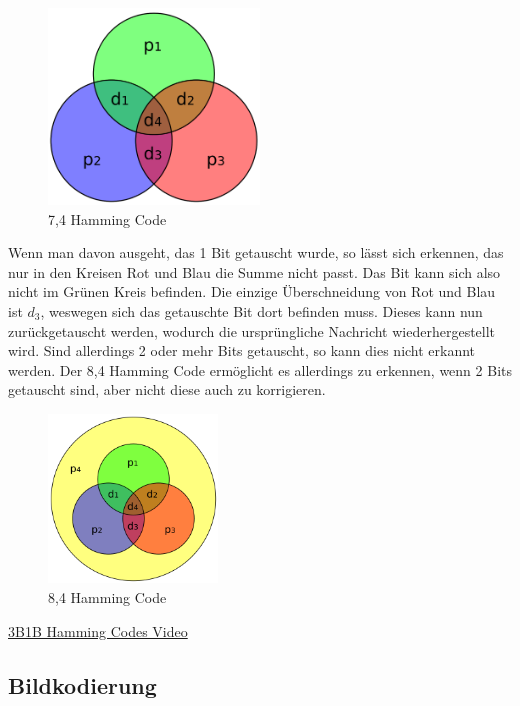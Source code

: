 \vspace*{-1cm}

\begin{figure}[H]
    \centering
    \includegraphics[width=0.5\textwidth]{images/hamming7.4.png}
    \caption{7,4 Hamming Code}
\end{figure}

Wenn man davon ausgeht, das 1 Bit getauscht wurde, so lässt sich erkennen,
das nur in den Kreisen Rot und Blau die Summe nicht passt. Das Bit kann
sich also nicht im Grünen Kreis befinden. Die einzige Überschneidung
von Rot und Blau ist $d_3$, weswegen sich das getauschte Bit dort befinden
muss. Dieses kann nun zurückgetauscht werden, wodurch die ursprüngliche Nachricht
wiederhergestellt wird. Sind allerdings 2 oder mehr Bits getauscht, so kann dies
nicht erkannt werden. Der 8,4 Hamming Code ermöglicht es allerdings zu erkennen, wenn
2 Bits getauscht sind, aber nicht diese auch zu korrigieren.

\begin{figure}[H]
    \centering
    \includegraphics[width=0.4\textwidth]{images/hamming8.4.png}
    \caption{8,4 Hamming Code}
\end{figure}

\href{https://www.youtube.com/watch?v=X8jsijhllIA}{3B1B Hamming Codes Video}

\subsection{Bildkodierung}

